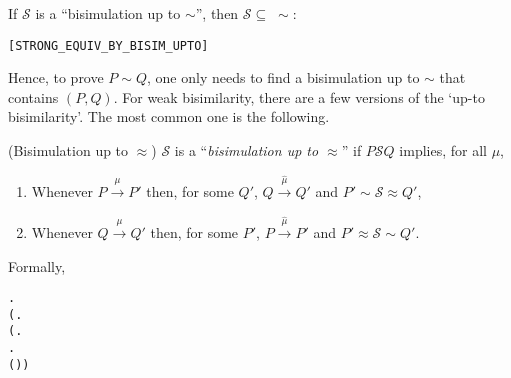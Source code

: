\begin{theorem}
If $\mathcal{S}$ is a ``bisimulation up to $\sim$'', then
$\mathcal{S} \subseteq\;\sim$:
\begin{alltt}
\HOLTokenTurnstile{}   \HOLSymConst{\HOLTokenConj{}}    \HOLSymConst{\HOLTokenImp{}}  \HOLSymConst{\HOLTokenStrongEQ} \hfill{[STRONG_EQUIV_BY_BISIM_UPTO]}
\end{alltt}
\end{theorem}
Hence, to prove $P \sim Q$, one only needs to find a bisimulation
up to $\sim$ that contains $(P, Q)$.
For weak bisimilarity, there are a few versions of the `up-to
  bisimilarity'. The most common one is the following.

\begin{definition}{(Bisimulation up to $\approx$)}
$\mathcal{S}$ is a ``\emph{bisimulation up to $\approx$}'' if $P
  \mathcal{S} Q$ implies, for all $\mu$,
\begin{enumerate}
\item Whenever $P \overset{\mu}{\rightarrow} P'$ then, for some
  $Q'$, $Q \overset{\hat{\mu}}{\rightarrow} Q'$ and $P' \sim \mathcal{S}
  \approx Q'$,
\item Whenever $Q \overset{\mu}{\rightarrow} Q'$ then, for some
  $P'$, $P \overset{\hat{\mu}}{\rightarrow} P'$ and $P' \approx \mathcal{S}
  \sim Q'$.
\end{enumerate}
Formally,
\begin{alltt}
  \HOLSymConst{\HOLTokenDefEquality{}}
  \HOLSymConst{\HOLTokenForall{}} .
         \HOLSymConst{\HOLTokenImp{}}
      (\HOLSymConst{\HOLTokenForall{}}.
           (\HOLSymConst{\HOLTokenForall{}}.
                 \HOLTokenTransBegin{} \HOLTokenTransEnd {} \HOLSymConst{\HOLTokenImp{}}
                \HOLSymConst{\HOLTokenExists{}}.
                     \HOLTokenWeakTransBegin{} \HOLTokenWeakTransEnd {} \HOLSymConst{\HOLTokenConj{}}
                    ( \HOLSymConst{\HOLTokenRCompose{}}  \HOLSymConst{\HOLTokenRCompose{}} )  ) \HOLSymConst{\HOLTokenConj{}}

\end{alltt}
\end{definition}
